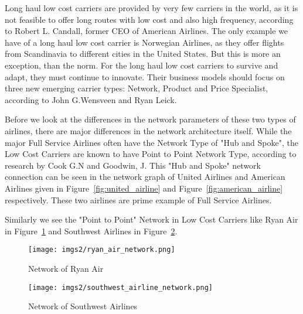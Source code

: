 \documentclass[twocolumn]{tum-article}
\begin{document}
Long haul low cost carriers are provided by very few carriers in the world, as it is not feasible to offer long routes with low cost and also high frequency, according to Robert L. Candall, former CEO of American Airlines.\cite{long_haul_lcc_model}
The only example we have of a long haul low cost carrier is Norwegian Airlines, as they offer flights from Scandinavia to different cities in the United States.
But this is more an exception, than the norm. For the long haul low cost carriers to survive and adapt, they must continue to innovate. Their business models should focus on three new emerging carrier types: Network, Product and Price Specialist, according to John G.Wensveen and Ryan Leick.\cite{long_haul_lcc_new_model}

Before we look at the differences in the network parameters of these two types of airlines, there are major differences in the network architecture itself.
While the major Full Service Airlines often have the Network Type of "Hub and Spoke", the Low Cost Carriers are known to have Point to Point Network Type, according to research by Cook G.N and Goodwin, J.\cite{airline_network_comparison}
This "Hub and Spoke" network connection can be seen in the network graph of United Airlines and American Airlines given in Figure~\ref{fig:united_airline} and Figure~\ref{fig:american_airline} respectively. These two airlines are prime example of Full Service Airlines. 

Similarly we see the "Point to Point" Network in Low Cost Carriers like Ryan Air in Figure~\ref{fig:ryan_air} and Southwest Airlines in Figure~\ref{fig:southwest_airline}.

\begin{figure}
        \centering
        \texttt{[image: imgs2/ryan\_air\_network.png]}
        \caption{
Network of Ryan Air}
        \label{fig:ryan_air}
\end{figure}

\begin{figure}
        \centering
        \texttt{[image: imgs2/southwest\_airline\_network.png]}
        \caption{
Network of Southwest Airlines}
        \label{fig:southwest_airline}
\end{figure}
\end{document}
